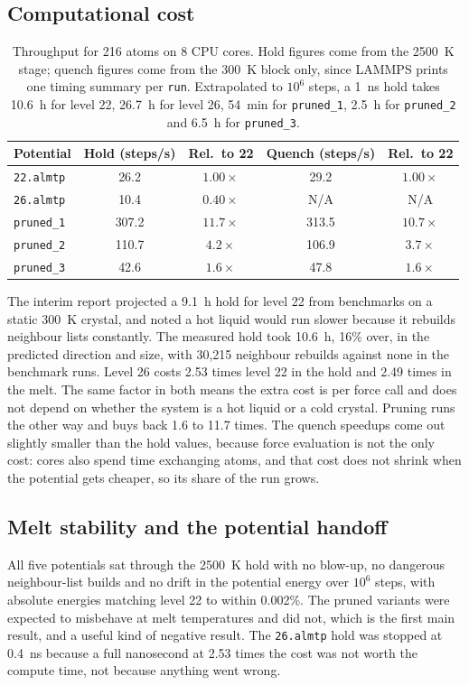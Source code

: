 \documentclass[11pt]{article}
\begin{document}
\subsection{Computational cost}
\label{sec:cost}

\begin{table}[H]
\centering\footnotesize
\begin{tabular}{lcccc}
\toprule
Potential & Hold (steps/s) & Rel.\ to 22 & Quench (steps/s) & Rel.\ to 22 \\
\midrule
\texttt{22.almtp}  & 26.2  & $1.00\times$ & 29.2  & $1.00\times$ \\
\texttt{26.almtp}  & 10.4  & $0.40\times$ & N/A    & N/A \\
\texttt{pruned\_1} & 307.2 & $11.7\times$ & 313.5 & $10.7\times$ \\
\texttt{pruned\_2} & 110.7 & $4.2\times$  & 106.9 & $3.7\times$ \\
\texttt{pruned\_3} & 42.6  & $1.6\times$  & 47.8  & $1.6\times$ \\
\bottomrule
\end{tabular}
\caption{Throughput for 216 atoms on 8 CPU cores. Hold figures come from the 2500~K stage; quench figures come from the 300~K block only, since LAMMPS prints one timing summary per \texttt{run}. Extrapolated to $10^6$ steps, a 1~ns hold takes 10.6~h for level 22, 26.7~h for level 26, 54~min for \texttt{pruned\_1}, 2.5~h for \texttt{pruned\_2} and 6.5~h for \texttt{pruned\_3}.}
\label{tab:cost}
\end{table}

The interim report projected a 9.1~h hold for level 22 from benchmarks on a static 300~K crystal, and noted a hot liquid would run slower because it rebuilds neighbour lists constantly. The measured hold took 10.6~h, 16\% over, in the predicted direction and size, with 30{,}215 neighbour rebuilds against none in the benchmark runs. Level 26 costs 2.53 times level 22 in the hold and 2.49 times in the melt. The same factor in both means the extra cost is per force call and does not depend on whether the system is a hot liquid or a cold crystal. Pruning runs the other way and buys back 1.6 to 11.7 times. The quench speedups come out slightly smaller than the hold values, because force evaluation is not the only cost: cores also spend time exchanging atoms, and that cost does not shrink when the potential gets cheaper, so its share of the run grows.

\subsection{Melt stability and the potential handoff}
\label{sec:melt}
All five potentials sat through the 2500~K hold with no blow-up, no dangerous neighbour-list builds and no drift in the potential energy over $10^6$ steps, with absolute energies matching level 22 to within 0.002\%. The pruned variants were expected to misbehave at melt temperatures and did not, which is the first main result, and a useful kind of negative result. The \texttt{26.almtp} hold was stopped at 0.4~ns because a full nanosecond at 2.53 times the cost was not worth the compute time, not because anything went wrong.
\end{document}
